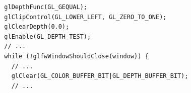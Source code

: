 \documentclass[calcdimensions,landscape,letterpaper]{powersem}
\newcommand{\thecurrentheading}{}
\newcommand{\heading}[1]{\renewcommand{\thecurrentheading}{#1}}
\begin{document}
\begin{slide}
    \heading{3D: Rotated Quad}
    \begin{center}
    \end{center}
\end{slide}

\begin{slide}
    \heading{3D: Enable Depth Testing}
    \begin{center}
        \begin{minipage}[c]{.8\textwidth}
            \begin{verbatim}
  glDepthFunc(GL_GEQUAL);
  glClipControl(GL_LOWER_LEFT, GL_ZERO_TO_ONE);
  glClearDepth(0.0);
  glEnable(GL_DEPTH_TEST);
  // ...
  while (!glfwWindowShouldClose(window)) {
    // ...
    glClear(GL_COLOR_BUFFER_BIT|GL_DEPTH_BUFFER_BIT);
    // ...
            \end{verbatim}
        \end{minipage}
    \end{center}
\end{slide}
\end{document}
